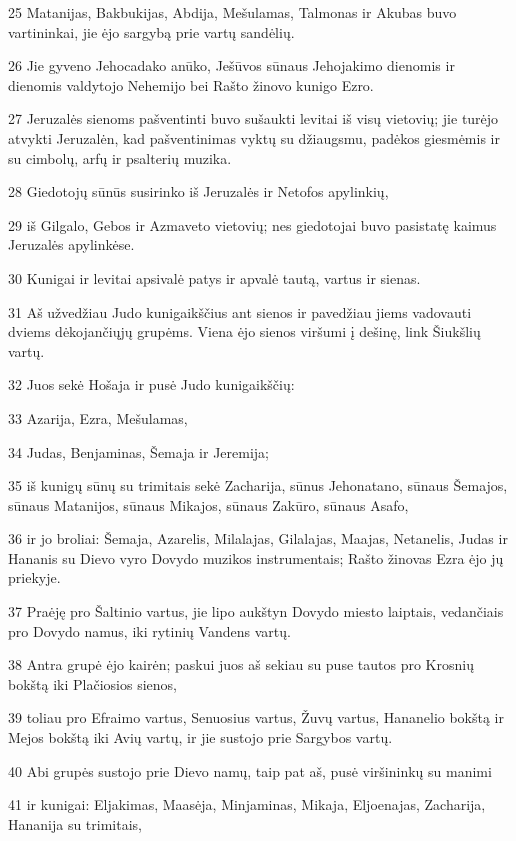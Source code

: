 \par 25 Matanijas, Bakbukijas, Abdija, Mešulamas, Talmonas ir Akubas buvo vartininkai, jie ėjo sargybą prie vartų sandėlių. 
\par 26 Jie gyveno Jehocadako anūko, Ješūvos sūnaus Jehojakimo dienomis ir dienomis valdytojo Nehemijo bei Rašto žinovo kunigo Ezro. 
\par 27 Jeruzalės sienoms pašventinti buvo sušaukti levitai iš visų vietovių; jie turėjo atvykti Jeruzalėn, kad pašventinimas vyktų su džiaugsmu, padėkos giesmėmis ir su cimbolų, arfų ir psalterių muzika. 
\par 28 Giedotojų sūnūs susirinko iš Jeruzalės ir Netofos apylinkių, 
\par 29 iš Gilgalo, Gebos ir Azmaveto vietovių; nes giedotojai buvo pasistatę kaimus Jeruzalės apylinkėse. 
\par 30 Kunigai ir levitai apsivalė patys ir apvalė tautą, vartus ir sienas. 
\par 31 Aš užvedžiau Judo kunigaikščius ant sienos ir pavedžiau jiems vadovauti dviems dėkojančiųjų grupėms. Viena ėjo sienos viršumi į dešinę, link Šiukšlių vartų. 
\par 32 Juos sekė Hošaja ir pusė Judo kunigaikščių: 
\par 33 Azarija, Ezra, Mešulamas, 
\par 34 Judas, Benjaminas, Šemaja ir Jeremija; 
\par 35 iš kunigų sūnų su trimitais sekė Zacharija, sūnus Jehonatano, sūnaus Šemajos, sūnaus Matanijos, sūnaus Mikajos, sūnaus Zakūro, sūnaus Asafo, 
\par 36 ir jo broliai: Šemaja, Azarelis, Milalajas, Gilalajas, Maajas, Netanelis, Judas ir Hananis su Dievo vyro Dovydo muzikos instrumentais; Rašto žinovas Ezra ėjo jų priekyje. 
\par 37 Praėję pro Šaltinio vartus, jie lipo aukštyn Dovydo miesto laiptais, vedančiais pro Dovydo namus, iki rytinių Vandens vartų. 
\par 38 Antra grupė ėjo kairėn; paskui juos aš sekiau su puse tautos pro Krosnių bokštą iki Plačiosios sienos, 
\par 39 toliau pro Efraimo vartus, Senuosius vartus, Žuvų vartus, Hananelio bokštą ir Mejos bokštą iki Avių vartų, ir jie sustojo prie Sargybos vartų. 
\par 40 Abi grupės sustojo prie Dievo namų, taip pat aš, pusė viršininkų su manimi 
\par 41 ir kunigai: Eljakimas, Maasėja, Minjaminas, Mikaja, Eljoenajas, Zacharija, Hananija su trimitais, 
